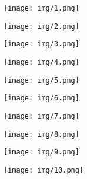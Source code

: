 \documentclass[compress]{beamer}
\begin{document}
\begin{frame}{}
    \begin{figure}
        \centering
        \texttt{[image: img/1.png]}
    \end{figure}
\end{frame}
\begin{frame}{}
    \begin{figure}
        \centering
        \texttt{[image: img/2.png]}
    \end{figure}
\end{frame}

\begin{frame}{}
    \begin{figure}
        \centering
        \texttt{[image: img/3.png]}
    \end{figure}
\end{frame}
\begin{frame}{}
    \begin{figure}
        \centering
        \texttt{[image: img/4.png]}
    \end{figure}
\end{frame}
\begin{frame}{}
    \begin{figure}
        \centering
        \texttt{[image: img/5.png]}
    \end{figure}
\end{frame}
\begin{frame}{}
    \begin{figure}
        \centering
        \texttt{[image: img/6.png]}
    \end{figure}
\end{frame}
\begin{frame}{}
    \begin{figure}
        \centering
        \texttt{[image: img/7.png]}
    \end{figure}
\end{frame}
\begin{frame}{}
    \begin{figure}
        \centering
        \texttt{[image: img/8.png]}
    \end{figure}
\end{frame}
\begin{frame}{}
    \begin{figure}
        \centering
        \texttt{[image: img/9.png]}
    \end{figure}
\end{frame}
\begin{frame}{}
    \begin{figure}
        \centering
        \texttt{[image: img/10.png]}
    \end{figure}
\end{frame}
\end{document}
